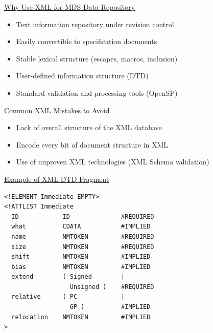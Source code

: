 \documentclass[a4]{seminar}
\begin{document}
\begin{slide}

\begin{center} \underline{Why Use XML for MDS Data Repository} \end{center}

\begin{itemize}

\item Text information repository under revision control

\item Easily convertible to specification documents

\item Stable lexical structure (escapes, macros, inclusion)

\item User-defined information structure (DTD)

\item Standard validation and processing tools (OpenSP)

\end{itemize}

\begin{center} \underline{Common XML Mistakes to Avoid} \end{center}

\begin{itemize}

\item Lack of overall structure of the XML database

\item Encode every bit of document structure in XML

\item Use of unproven XML technologies (XML Schema validation)

\end{itemize}

\begin{center}  \end{center}

\end{slide}


\begin{slide}

\begin{center} \underline{Example of XML DTD Fragment} \end{center}

{\small
\begin{verbatim}
<!ELEMENT Immediate EMPTY>
<!ATTLIST Immediate
  ID            ID              #REQUIRED
  what          CDATA           #IMPLIED
  name          NMTOKEN         #REQUIRED
  size          NMTOKEN         #REQUIRED
  shift         NMTOKEN         #IMPLIED
  bias          NMTOKEN         #IMPLIED
  extend        ( Signed        |
                  Unsigned )    #REQUIRED
  relative      ( PC            |
                  GP )          #IMPLIED
  relocation    NMTOKEN         #IMPLIED
>
\end{verbatim}
}

\end{slide}
\end{document}
